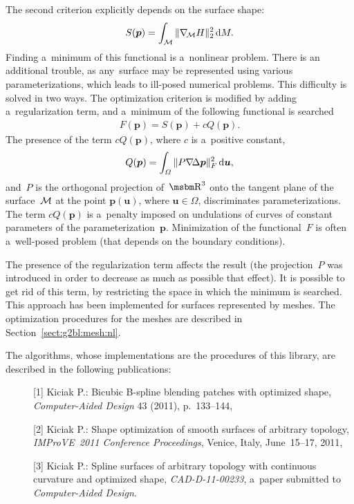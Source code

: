 The second criterion explicitly depends on the surface shape:
\newcommand{\nablaM}{\nabla_{\!\cal M}}
\begin{align}
\label{eq:g2mbl:S}
  S(\bm{p}) = \int_{\cal M}\|\nablaM H\|_2^2\,\mathrm{d}M.
\end{align}
Finding a~minimum of this functional is a~nonlinear problem. There is an
additional trouble, as any~surface may be represented using various
parameterizations, which leads to ill-posed numerical problems. This
difficulty is solved in two ways. The optimization criterion is modified by
adding a~regularization term, and a~minimum of the following functional is
searched
\begin{align}
\label{eq:g2mbl:opt:F}
  F(\bm{p}) = S(\bm{p})+cQ(\bm{p}).
\end{align}
The presence of the term $cQ(\bm{p})$, where $c$ is a~positive constant,
\begin{align}
\label{eq:g2mbl:Q}
  Q(\bm{p}) = \int_{\varOmega}\|P\nabla\!\Delta\bm{p}\|_F^2\,\mathrm{d}\bm{u},
\end{align}
and~$P$ is the orthogonal projection of~$\R^3$ onto the tangent plane of the
surface~$\cal M$ at the point $\bm{p}(\bm{u})$, where $\bm{u}\in\varOmega$,
discriminates parameterizations. The term $cQ(\bm{p})$ is a~penalty imposed
on undulations of curves of constant parameters of the
parameterization~$\bm{p}$. Minimization of the functional~$F$ is often
a~well-posed problem (that depends on the boundary conditions).

The presence of the regularization term affects the result (the
projection~$P$ was introduced in order to decrease as much as possible
that effect). It is possible to get rid of this term, by restricting the
space in which the minimum is searched. This approach has been implemented
for surfaces represented by meshes. The optimization procedures for the
meshes are described in Section~\ref{sect:g2bl:mesh:nl}.

The algorithms, whose implementations are the procedures of this library,
are described in the following publications:
\begin{description}
  \item[][1] Kiciak P.: Bicubic B-spline blending patches with optimized shape,
    \emph{Computer-Aided Design} 43 (2011), p.~133--144,
  \item[][2] Kiciak P.: Shape optimization of smooth surfaces of arbitrary
    topology, \emph{IMProVE~2011 Conference Proceedings}, Venice, Italy,
    June~15--17, 2011,
  \item[][3] Kiciak P.: Spline surfaces of arbitrary topology with continuous
    curvature and optimized shape, \emph{CAD-D-11-00233}, a~paper submitted
    to \emph{Computer-Aided Design}.
\end{description}


